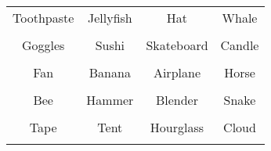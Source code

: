 \documentclass[12pt,a4paper]{article}
\begin{document}
\thispagestyle{empty}
\begin{table}[]
\centering
\Huge
\begin{tabular}{cccc}
 Toothpaste& Jellyfish& Hat& Whale\\  & & & \\
 Goggles& Sushi& Skateboard& Candle\\  & & & \\
 Fan& Banana& Airplane& Horse\\  & & & \\
 Bee& Hammer& Blender& Snake\\  & & & \\
 Tape& Tent& Hourglass& Cloud\\  & & & \\
\end{tabular}
\end{table}
\end{document}
